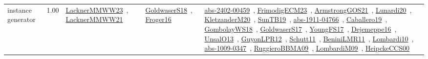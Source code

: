 {\begin{longtable}{p{3cm}r>{\raggedright\arraybackslash}p{6cm}>{\raggedright\arraybackslash}p{6cm}>{\raggedright\arraybackslash}p{8cm}}
\index{instance generator}\index{Benchmarks!instance generator}instance generator &  1.00 & \href{../works/LacknerMMWW23.pdf}{LacknerMMWW23}~\cite{LacknerMMWW23}, \href{../works/LacknerMMWW21.pdf}{LacknerMMWW21}~\cite{LacknerMMWW21} & \href{../works/GoldwaserS18.pdf}{GoldwaserS18}~\cite{GoldwaserS18}, \href{../works/Froger16.pdf}{Froger16}~\cite{Froger16} & \href{../works/abs-2402-00459.pdf}{abs-2402-00459}~\cite{abs-2402-00459}, \href{../works/FrimodigECM23.pdf}{FrimodigECM23}~\cite{FrimodigECM23}, \href{../works/ArmstrongGOS21.pdf}{ArmstrongGOS21}~\cite{ArmstrongGOS21}, \href{../works/Lunardi20.pdf}{Lunardi20}~\cite{Lunardi20}, \href{../works/KletzanderM20.pdf}{KletzanderM20}~\cite{KletzanderM20}, \href{../works/SunTB19.pdf}{SunTB19}~\cite{SunTB19}, \href{../works/abs-1911-04766.pdf}{abs-1911-04766}~\cite{abs-1911-04766}, \href{../works/Caballero19.pdf}{Caballero19}~\cite{Caballero19}, \href{../works/GombolayWS18.pdf}{GombolayWS18}~\cite{GombolayWS18}, \href{../works/GoldwaserS17.pdf}{GoldwaserS17}~\cite{GoldwaserS17}, \href{../works/YoungFS17.pdf}{YoungFS17}~\cite{YoungFS17}, \href{../works/Dejemeppe16.pdf}{Dejemeppe16}~\cite{Dejemeppe16}, \href{../works/UnsalO13.pdf}{UnsalO13}~\cite{UnsalO13}, \href{../works/GuyonLPR12.pdf}{GuyonLPR12}~\cite{GuyonLPR12}, \href{../works/Schutt11.pdf}{Schutt11}~\cite{Schutt11}, \href{../works/BeniniLMR11.pdf}{BeniniLMR11}~\cite{BeniniLMR11}, \href{../works/Lombardi10.pdf}{Lombardi10}~\cite{Lombardi10}, \href{../works/abs-1009-0347.pdf}{abs-1009-0347}~\cite{abs-1009-0347}, \href{../works/RuggieroBBMA09.pdf}{RuggieroBBMA09}~\cite{RuggieroBBMA09}, \href{../works/LombardiM09.pdf}{LombardiM09}~\cite{LombardiM09}, \href{../works/HeipckeCCS00.pdf}{HeipckeCCS00}~\cite{HeipckeCCS00}\\

\end{longtable}}
